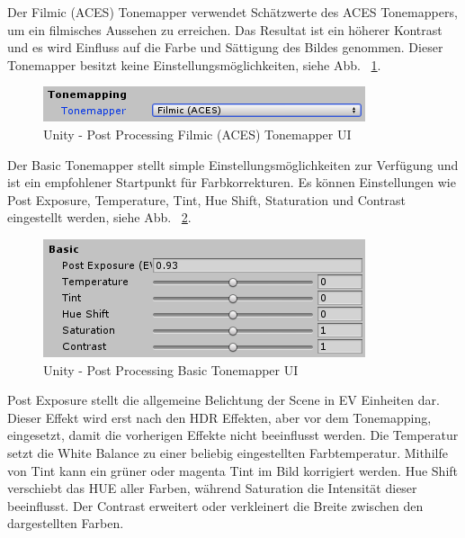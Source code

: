Der Filmic (ACES) Tonemapper verwendet Schätzwerte  des ACES Tonemappers, um ein filmisches Aussehen zu erreichen.
Das Resultat ist ein höherer Kontrast und es wird Einfluss auf die Farbe und Sättigung des Bildes genommen.
Dieser Tonemapper besitzt keine Einstellungsmöglichkeiten, siehe Abb. ~\ref{fig:unity-post-processing-filmic-aces-tonemapper-ui}.

\begin {figure}
    \centering
    \includegraphics[scale=0.9]{pics/unity-post-processing-color-grading-filmic}
    \caption{Unity - Post Processing Filmic (ACES) Tonemapper UI}
    \label{fig:unity-post-processing-filmic-aces-tonemapper-ui}
\end {figure}

Der Basic Tonemapper stellt simple Einstellungsmöglichkeiten zur Verfügung und ist ein empfohlener Startpunkt für Farbkorrekturen.
Es können Einstellungen wie Post Exposure, Temperature, Tint, Hue Shift, Staturation und Contrast eingestellt werden, siehe Abb. ~\ref{fig:unity-post-processing-basic-tonemapper-ui}.
\begin {figure}
    \centering
    \includegraphics[scale=0.9]{pics/unity-post-processing-color-grading-basicTonemapper}
    \caption{Unity - Post Processing Basic Tonemapper UI}
    \label{fig:unity-post-processing-basic-tonemapper-ui}
\end {figure}

Post Exposure stellt die allgemeine Belichtung der Scene in EV Einheiten dar.
Dieser Effekt wird erst nach den HDR Effekten, aber vor dem Tonemapping, eingesetzt, damit die vorherigen Effekte nicht beeinflusst werden.
Die Temperatur setzt die White Balance zu einer beliebig eingestellten Farbtemperatur.
Mithilfe von Tint kann ein grüner oder magenta Tint im Bild korrigiert werden.
Hue Shift verschiebt das HUE aller Farben, während Saturation die Intensität dieser beeinflusst.
Der Contrast erweitert oder verkleinert die Breite zwischen den dargestellten Farben.

